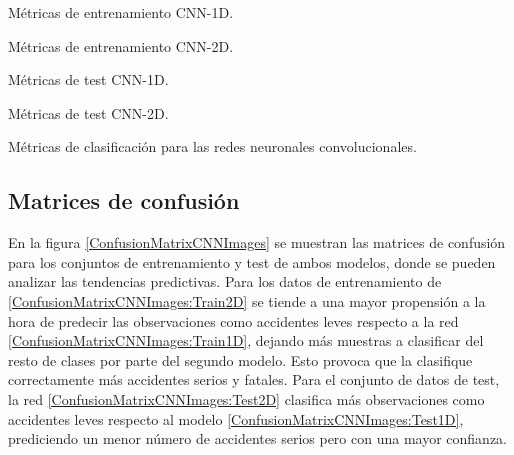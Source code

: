     \begin{table}[H]
        \scriptsize
        \renewcommand{\arraystretch}{1.1}
        \begin{subtable}{.5\textwidth}        
          \caption{Métricas de entrenamiento CNN-1D.}
          \label{ClassificationReportCNN:TrainCNN1D}
        \end{subtable}
        \hspace{1em}
        \begin{subtable}{.5\textwidth}
          \centering
          \caption{Métricas de entrenamiento CNN-2D.}
          \label{ClassificationReportCNN:TrainCNN2D}
        \end{subtable}
        \vspace*{2mm}
        \begin{subtable}{.5\textwidth}     
          \caption{Métricas de test CNN-1D.}
          \label{ClassificationReportCNN:TestCNN1D}
        \end{subtable}
        \hspace{.75em}
        \begin{subtable}{.5\textwidth}     
          \centering
          \caption{Métricas de test CNN-2D.}
          \label{ClassificationReportCNN:TestCNN2D}
        \end{subtable}
        \caption{Métricas de clasificación para las redes neuronales convolucionales.}
        \label{ClassificationReportCNN}
    \end{table}
  

  \subsection{Matrices de confusión}

    En la figura \eqref{ConfusionMatrixCNNImages} se muestran las matrices de confusión para los conjuntos de entrenamiento y test de ambos modelos, donde se pueden analizar las tendencias predictivas. Para los datos de entrenamiento de  \eqref{ConfusionMatrixCNNImages:Train2D} se tiende a una mayor propensión a la hora de predecir las observaciones como accidentes leves respecto a la red  \eqref{ConfusionMatrixCNNImages:Train1D}, dejando más muestras a clasificar del resto de clases por parte del segundo modelo. Esto provoca que la  clasifique correctamente más accidentes serios y fatales. Para el conjunto de datos de test, la red  \eqref{ConfusionMatrixCNNImages:Test2D} clasifica más observaciones como accidentes leves respecto al modelo  \eqref{ConfusionMatrixCNNImages:Test1D}, prediciendo un menor número de accidentes serios pero con una mayor confianza.

